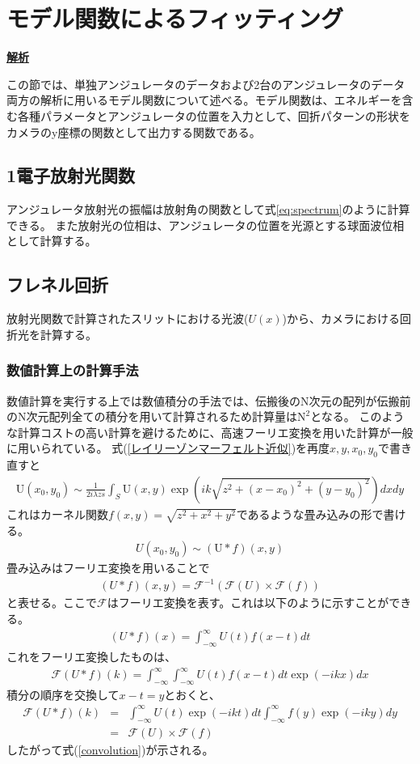 \documentclass[a4paper,11pt,uplatex]{jsbook}
\begin{document}
\section{モデル関数によるフィッティング}
\noindent \textbf{\underline{解析}}\par
この節では、単独アンジュレータのデータおよび2台のアンジュレータのデータ両方の解析に用いるモデル関数について述べる。モデル関数は、エネルギーを含む各種パラメータとアンジュレータの位置を入力として、回折パターンの形状をカメラのy座標の関数として出力する関数である。
\subsection{1電子放射光関数}
アンジュレータ放射光の振幅は放射角の関数として式\ref{eq:spectrum}のように計算できる。
また放射光の位相は、アンジュレータの位置を光源とする球面波位相として計算する。
\subsection{フレネル回折}
放射光関数で計算されたスリットにおける光波($U(x)$)から、カメラにおける回折光を計算する。
\subsubsection{数値計算上の計算手法}
数値計算を実行する上では数値積分の手法では、伝搬後のN次元の配列が伝搬前のN次元配列全ての積分を用いて計算されるため計算量は$\text{N}^2$となる。
このような計算コストの高い計算を避けるために、高速フーリエ変換を用いた計算が一般に用いられている。
式(\ref{レイリーゾンマーフェルト近似})を再度$x,y,x_0,y_0$で書き直すと
\begin{eqnarray}
  \text{U}(x_0,y_0) \sim \frac{1}{2i\lambda zs}\int_S \text{U}(x,y) \exp( ik \sqrt{z^2 + (x-x_0)^2 + (y-y_0)^2}) dxdy
\end{eqnarray}
これはカーネル関数$f(x,y) = \sqrt{z^2 +x^2 + y^2}$であるような畳み込みの形で書ける。
\begin{eqnarray}
  U(x_0,y_0) \sim (\text{U} * f)(x,y)
\end{eqnarray}
畳み込みはフーリエ変換を用いることで
\begin{eqnarray}
  (U*f)(x,y) = \mathcal{F}^{-1}(\mathcal{F}(U) \times \mathcal{F}(f)) \label{convolution}
\end{eqnarray}
と表せる。ここで$\mathcal{F}$はフーリエ変換を表す。これは以下のように示すことができる。
\begin{eqnarray}
  (U*f)(x) = \int_{-\infty}^{\infty} U(t)f(x-t)dt
\end{eqnarray}
これをフーリエ変換したものは、
\begin{eqnarray}
  \mathcal{F}(U*f)(k) = \int_{-\infty}^{\infty} \int_{-\infty}^{\infty} U(t)f(x-t)dt \exp(-ikx)dx
\end{eqnarray}
積分の順序を交換して$x-t = y$とおくと、
\begin{eqnarray}
  \mathcal{F}(U*f)(k) &=& \int_{-\infty}^{\infty} U(t) \exp(-ikt)dt \int_{-\infty}^{\infty} f(y) \exp(-iky)dy\\
  &=& \mathcal{F}(U) \times \mathcal{F}(f)
\end{eqnarray}
したがって式(\ref{convolution})が示される。
\end{document}
